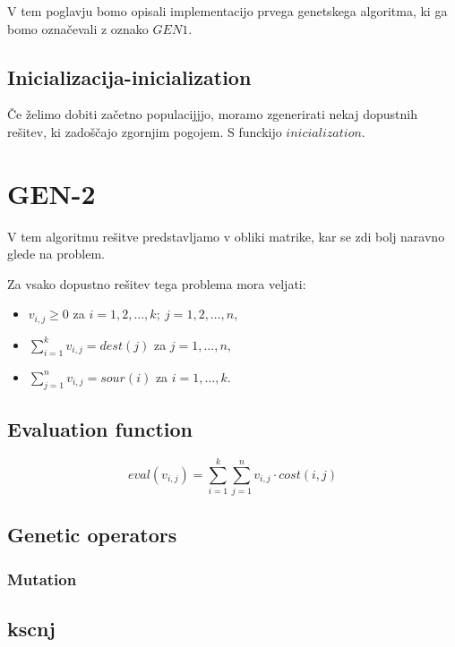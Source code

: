 \documentclass[12pt,a4paper,twoside]{article}
\theoremstyle{definition} %
\theoremstyle{plain} %
\numberwithin{equation}{section}  %
\begin{document}
V tem poglavju bomo opisali implementacijo prvega genetskega algoritma, ki ga bomo označevali z oznako $GEN1$.

\subsection{Inicializacija-inicialization}

Če želimo dobiti začetno populacijjjo, moramo zgenerirati nekaj dopustnih rešitev, ki zadoščajo zgornjim pogojem. S funckijo $inicialization$. 

\section{GEN-2}

V tem algoritmu rešitve predstavljamo v obliki matrike, kar se zdi bolj naravno glede na problem.

\noindent Za vsako dopustno rešitev tega problema mora veljati:
\begin{itemize}
\item $v_{i,j} \geq 0$ za $i=1, 2, \dots, k;~ j=1,2, \dots, n$,
\item $\sum\limits_{i=1}^{k} v_{i,j} = dest(j)$ za $j=1, \dots, n$,
\item $\sum\limits_{j=1}^{n} v_{i,j}= sour(i)$ za $i=1, \dots, k$.
\end{itemize}

\subsection{Evaluation function}

$$eval(v_{i,j}) = \sum\limits_{i=1}^{k} \sum\limits_{j=1}^{n} v_{i,j} \cdot cost(i,j)$$

\subsection{Genetic operators}

\subsubsection{Mutation}



\subsection{kscnj}
\end{document}
